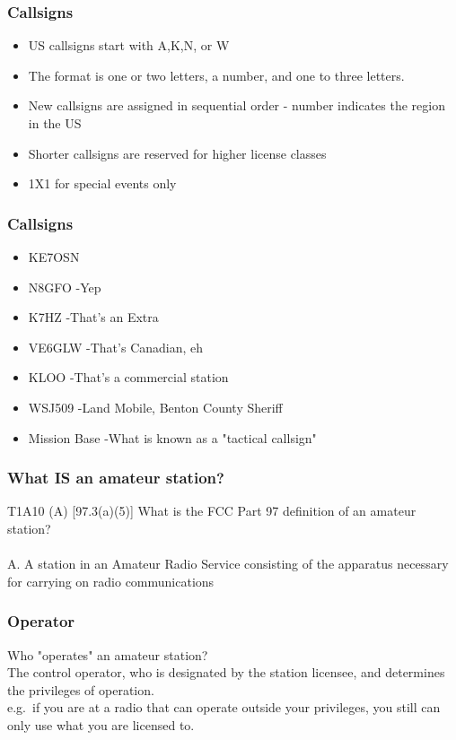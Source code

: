 \documentclass[12pt]{beamer}
\begin{document}
\begin{frame}
\frametitle{Callsigns}
\begin{itemize}
\item US callsigns start with A,K,N, or W
\item The format is one or two letters, a number, and one to three letters.
\item New callsigns are assigned in sequential order - number indicates the region in the US
\item Shorter callsigns are reserved for higher license classes
\item 1X1 for special events only
\end{itemize}
\end{frame}

\begin{frame}
\frametitle{Callsigns}
\begin{itemize}
\item KE7OSN \pause
\item N8GFO \pause -Yep \pause
\item K7HZ \pause -That's an Extra \pause
\item VE6GLW \pause -That's Canadian, eh\pause
\item KLOO \pause -That's a commercial station \pause
\item WSJ509 \pause -Land Mobile, Benton County Sheriff \pause
\item Mission Base \pause -What is known as a "tactical callsign"
\end{itemize}
\end{frame}

\begin{frame}
\frametitle{What IS an amateur station?}
T1A10 (A) [97.3(a)(5)] What is the FCC Part 97 definition of an amateur station?\\ \pause \hfil \\
A. A station in an Amateur Radio Service consisting of the apparatus necessary for carrying on radio
communications
\end{frame}

\begin{frame}
\frametitle{Operator}
Who "operates" an amateur station? \pause \\
The control operator, who is designated by the station licensee, and determines the privileges of operation.\\
e.g.\ if you are at a radio that can operate outside your privileges, you still can only use what you are licensed to.
\end{frame}
\end{document}
